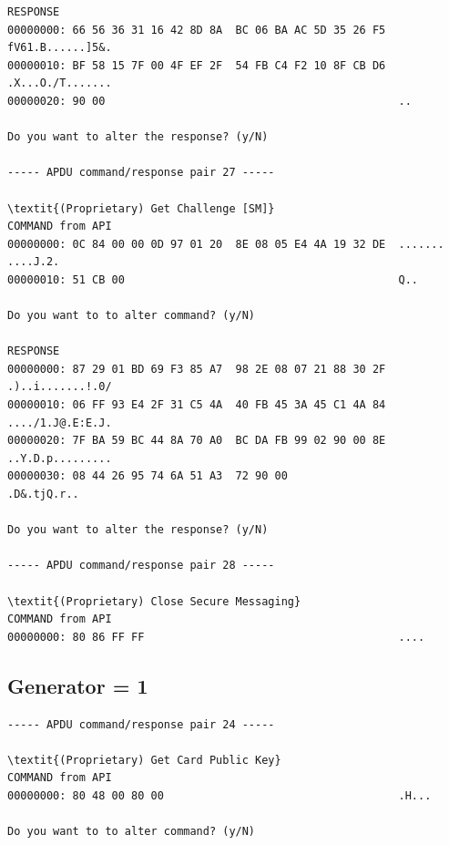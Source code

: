 \documentclass[bsc,frontabs,twoside,singlespacing,parskip,deptreport]{infthesis}     %
\begin{document}
\begin{appendices}
\begin{Verbatim}[commandchars=\\\{\}, fontsize=\small]
RESPONSE
00000000: 66 56 36 31 16 42 8D 8A  BC 06 BA AC 5D 35 26 F5  fV61.B......]5&.
00000010: BF 58 15 7F 00 4F EF 2F  54 FB C4 F2 10 8F CB D6  .X...O./T.......
00000020: 90 00                                             ..

Do you want to alter the response? (y/N)

----- APDU command/response pair 27 -----

\textit{(Proprietary) Get Challenge [SM]}
COMMAND from API
00000000: 0C 84 00 00 0D 97 01 20  8E 08 05 E4 4A 19 32 DE  ....... ....J.2.
00000010: 51 CB 00                                          Q..

Do you want to to alter command? (y/N)

RESPONSE
00000000: 87 29 01 BD 69 F3 85 A7  98 2E 08 07 21 88 30 2F  .)..i.......!.0/
00000010: 06 FF 93 E4 2F 31 C5 4A  40 FB 45 3A 45 C1 4A 84  ..../1.J@.E:E.J.
00000020: 7F BA 59 BC 44 8A 70 A0  BC DA FB 99 02 90 00 8E  ..Y.D.p.........
00000030: 08 44 26 95 74 6A 51 A3  72 90 00                 .D&.tjQ.r..

Do you want to alter the response? (y/N)

----- APDU command/response pair 28 -----

\textit{(Proprietary) Close Secure Messaging}
COMMAND from API
00000000: 80 86 FF FF                                       ....
\end{Verbatim}
\subsection{Generator = 1}
\begin{Verbatim}[commandchars=\\\{\}, fontsize=\small]
----- APDU command/response pair 24 -----

\textit{(Proprietary) Get Card Public Key}
COMMAND from API
00000000: 80 48 00 80 00                                    .H...

Do you want to to alter command? (y/N)


\end{Verbatim}
\end{appendices}
\end{document}
